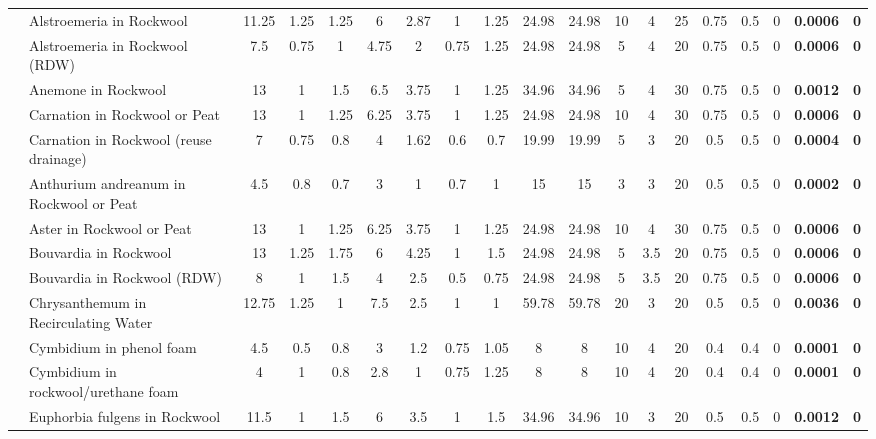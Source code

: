 \documentclass[
  letterpaper,
  DIV=11,
  numbers=noendperiod]{scrreprt}
\begin{document}
\begin{landscape}
\begin{longtable}[t]{llccccccccccccccc>{}c>{}c}
\cmidrule{1-19}\pagebreak[0]
 & Alstroemeria in Rockwool & 11.25 & 1.25 & 1.25 & 6 & 2.87 & 1 & 1.25 & 24.98 & 24.98 & 10 & 4 & 25 & 0.75 & 0.5 & 0 & \textbf{0.0006} & \textbf{0}\\
\nopagebreak
 & Alstroemeria in Rockwool (RDW) & 7.5 & 0.75 & 1 & 4.75 & 2 & 0.75 & 1.25 & 24.98 & 24.98 & 5 & 4 & 20 & 0.75 & 0.5 & 0 & \textbf{0.0006} & \textbf{0}\\
\nopagebreak
 & Anemone in Rockwool & 13 & 1 & 1.5 & 6.5 & 3.75 & 1 & 1.25 & 34.96 & 34.96 & 5 & 4 & 30 & 0.75 & 0.5 & 0 & \textbf{0.0012} & \textbf{0}\\
\nopagebreak
 & Carnation in Rockwool or Peat & 13 & 1 & 1.25 & 6.25 & 3.75 & 1 & 1.25 & 24.98 & 24.98 & 10 & 4 & 30 & 0.75 & 0.5 & 0 & \textbf{0.0006} & \textbf{0}\\
\nopagebreak
 & Carnation in Rockwool (reuse drainage) & 7 & 0.75 & 0.8 & 4 & 1.62 & 0.6 & 0.7 & 19.99 & 19.99 & 5 & 3 & 20 & 0.5 & 0.5 & 0 & \textbf{0.0004} & \textbf{0}\\
\nopagebreak
 & Anthurium andreanum in Rockwool or Peat & 4.5 & 0.8 & 0.7 & 3 & 1 & 0.7 & 1 & 15 & 15 & 3 & 3 & 20 & 0.5 & 0.5 & 0 & \textbf{0.0002} & \textbf{0}\\
\nopagebreak
 & Aster in Rockwool or Peat & 13 & 1 & 1.25 & 6.25 & 3.75 & 1 & 1.25 & 24.98 & 24.98 & 10 & 4 & 30 & 0.75 & 0.5 & 0 & \textbf{0.0006} & \textbf{0}\\
\nopagebreak
 & Bouvardia in Rockwool & 13 & 1.25 & 1.75 & 6 & 4.25 & 1 & 1.5 & 24.98 & 24.98 & 5 & 3.5 & 20 & 0.75 & 0.5 & 0 & \textbf{0.0006} & \textbf{0}\\
\nopagebreak
 & Bouvardia in Rockwool (RDW) & 8 & 1 & 1.5 & 4 & 2.5 & 0.5 & 0.75 & 24.98 & 24.98 & 5 & 3.5 & 20 & 0.75 & 0.5 & 0 & \textbf{0.0006} & \textbf{0}\\
\nopagebreak
 & Chrysanthemum in Recirculating Water & 12.75 & 1.25 & 1 & 7.5 & 2.5 & 1 & 1 & 59.78 & 59.78 & 20 & 3 & 20 & 0.5 & 0.5 & 0 & \textbf{0.0036} & \textbf{0}\\
\nopagebreak
 & Cymbidium in phenol foam & 4.5 & 0.5 & 0.8 & 3 & 1.2 & 0.75 & 1.05 & 8 & 8 & 10 & 4 & 20 & 0.4 & 0.4 & 0 & \textbf{0.0001} & \textbf{0}\\
\nopagebreak
 & Cymbidium in rockwool/urethane foam & 4 & 1 & 0.8 & 2.8 & 1 & 0.75 & 1.25 & 8 & 8 & 10 & 4 & 20 & 0.4 & 0.4 & 0 & \textbf{0.0001} & \textbf{0}\\
\nopagebreak
 & Euphorbia fulgens in Rockwool & 11.5 & 1 & 1.5 & 6 & 3.5 & 1 & 1.5 & 34.96 & 34.96 & 10 & 3 & 20 & 0.5 & 0.5 & 0 & \textbf{0.0012} & \textbf{0}\\

\end{longtable}
\end{landscape}
\end{document}
